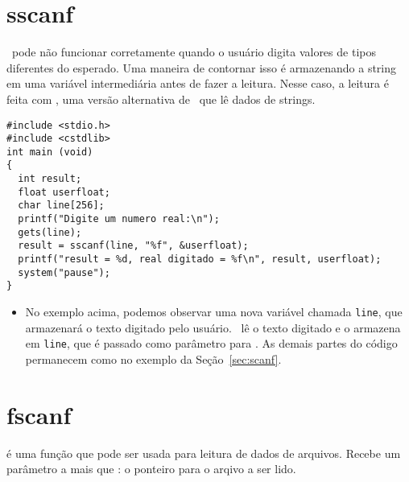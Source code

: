 \section{sscanf}
\label{sec:sscanf}

\SCANF\ pode não funcionar corretamente quando o usuário digita valores de tipos diferentes do esperado. Uma maneira de contornar isso é armazenando a string em uma variável intermediária antes de fazer a leitura. Nesse caso, a leitura é feita com \SSCANF, uma versão alternativa de \SCANF\ que lê dados de strings.

\begin{lstlisting}
#include <stdio.h> 
#include <cstdlib> 
int main (void)
{
  int result;
  float userfloat;
  char line[256];
  printf("Digite um numero real:\n");
  gets(line);
  result = sscanf(line, "%f", &userfloat);
  printf("result = %d, real digitado = %f\n", result, userfloat);
  system("pause");
}
\end{lstlisting}

\begin{itemize}

\item No exemplo acima, podemos observar uma nova variável chamada {\tt line}, que armazenará o texto digitado pelo usuário. \GETS\ lê o texto digitado e o armazena em {\tt line}, que é passado como parâmetro para \SSCANF. As demais partes do código permanecem como no exemplo da Seção~\ref{sec:scanf}.

\end{itemize}



\section{fscanf}
\label{sec:fscanf}

\FSCANF é uma função que pode ser usada para leitura de dados de arquivos. Recebe um parâmetro a mais que \SCANF: o ponteiro para o arqivo a ser lido.

